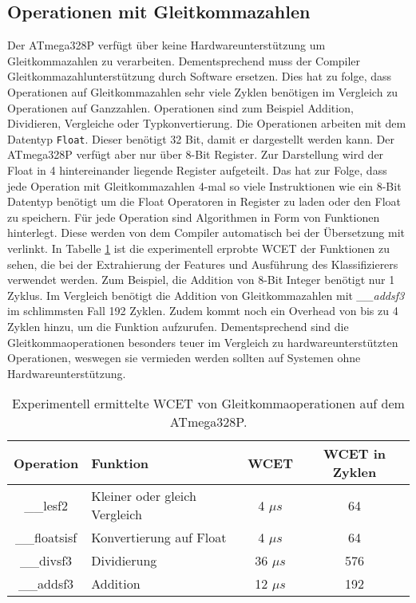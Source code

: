 \subsection{Operationen mit Gleitkommazahlen}
Der ATmega328P verfügt über keine Hardwareunterstützung um Gleitkommazahlen zu verarbeiten. Dementsprechend muss der Compiler Gleitkommazahlunterstützung durch Software ersetzen. Dies hat zu folge, dass Operationen
auf Gleitkommazahlen sehr viele Zyklen benötigen im Vergleich zu Operationen auf Ganzzahlen. Operationen sind zum Beispiel Addition, Dividieren, Vergleiche oder Typkonvertierung.
\newline
\newline
Die Operationen arbeiten mit dem Datentyp \texttt{Float}. Dieser benötigt 32 Bit, damit er dargestellt werden kann. Der ATmega328P verfügt aber nur über 8-Bit Register. Zur Darstellung wird der Float in 4 hintereinander
liegende Register aufgeteilt. Das hat zur Folge, dass jede Operation mit Gleitkommazahlen 4-mal so viele Instruktionen wie ein 8-Bit Datentyp benötigt um die Float Operatoren in Register zu laden oder den
Float zu speichern.
\newline
\newline
Für jede Operation sind Algorithmen in Form von Funktionen hinterlegt. Diese werden von dem Compiler automatisch bei der Übersetzung mit verlinkt. In Tabelle \ref{tab:float_operations} ist die experimentell erprobte WCET
der Funktionen zu sehen, die bei der Extrahierung der Features und Ausführung des Klassifizierers verwendet werden. Zum Beispiel, die Addition von 8-Bit Integer benötigt nur 1 Zyklus. Im Vergleich benötigt die Addition
von Gleitkommazahlen mit \textit{\_\_addsf3} im schlimmsten Fall 192 Zyklen. Zudem kommt noch ein Overhead von bis zu 4 Zyklen hinzu, um die Funktion aufzurufen. Dementsprechend sind die Gleitkommaoperationen besonders
teuer im Vergleich zu hardwareunterstützten Operationen, weswegen sie vermieden werden sollten auf Systemen ohne Hardwareunterstützung.
\begin{table}[h!]
    \centering
    \begin{tabular}{ | c | l | c | c |}
        \hline
        Operation & Funktion & WCET & WCET in Zyklen \\\hline
        \_\_lesf2 & Kleiner oder gleich Vergleich & 4 $\mu s$ & 64 \\\hline
        \_\_floatsisf & Konvertierung auf Float & 4 $\mu s$ & 64 \\\hline
        \_\_divsf3 & Dividierung & 36 $\mu s$ & 576 \\\hline
        \_\_addsf3 & Addition & 12 $\mu s$ & 192 \\\hline
    \end{tabular}
    \caption{Experimentell ermittelte WCET von Gleitkommaoperationen auf dem ATmega328P.}
    \label{tab:float_operations}
\end{table}